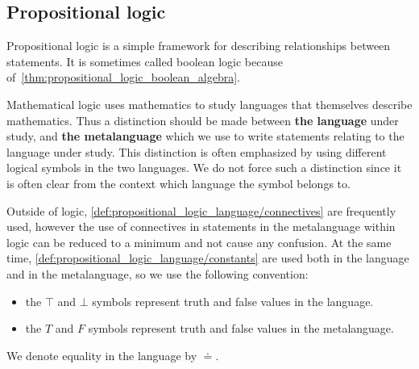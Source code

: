 \subsection{Propositional logic}\label{subsec:propositional_logic}

Propositional logic is a simple framework for describing relationships between statements. It is sometimes called boolean logic because of~\cref{thm:propositional_logic_boolean_algebra}.

\begin{note}\label{note:metalanguage}
  Mathematical logic uses mathematics to study languages that themselves describe mathematics. Thus a distinction should be made between \textbf{the language} under study, and \textbf{the metalanguage} which we use to write statements relating to the language under study. This distinction is often emphasized by using different logical symbols in the two languages. We do not force such a distinction since it is often clear from the context which language the symbol belongs to.

  Outside of logic, \ref{def:propositional_logic_language/connectives} are frequently used, however the use of connectives in statements in the metalanguage within logic can be reduced to a minimum and not cause any confusion. At the same time, \ref{def:propositional_logic_language/constants} are used both in the language and in the metalanguage, so we use the following convention:
  \begin{itemize}
    \item the \( \top \) and \( \bot \) symbols represent truth and false values in the language.
    \item the \( T \) and \( F \) symbols represent truth and false values in the metalanguage.
  \end{itemize}

  We denote equality in the language by \( \doteq \).
\end{note}

